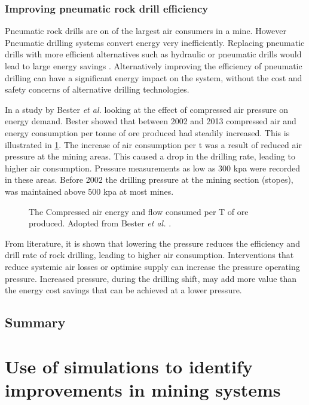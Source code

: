		\subsubsection{Improving pneumatic rock drill efficiency}
		 Pneumatic rock drills are on of the largest air consumers in a mine. However Pneumatic drilling systems convert energy very inefficiently. Replacing pneumatic drills with more efficient alternatives such as hydraulic or pneumatic drills would lead to large energy savings \cite{Pascoe2016Masters}.  Alternatively improving the efficiency of pneumatic drilling can have a significant energy impact on the system, without the cost and safety concerns of alternative drilling technologies.
		 \par 
		  In a study by  Bester \textit{et al.} \cite{bester2013effect} looking at the effect of compressed air pressure on energy demand. Bester showed that between 2002 and 2013 compressed air and energy consumption per tonne of ore produced had steadily increased. This is illustrated  in \cref{fig: Compressed energy and air flow per ton}. 
		 The increase of air consumption per \gls{t} was a result of reduced air pressure at the mining areas. This caused a drop in the drilling rate, leading to higher air consumption. Pressure measurements as low as 300 \gls{kpa} were recorded in these areas. Before 2002 the drilling pressure at the mining section (stopes), was maintained above 500 \gls{kpa} at most mines. 
		 \par 
		 \begin{figure}[h]
		 	\centering
		 	
		 	\caption[The Compressed air energy and flow consumed per T of ore produced.]{The Compressed air energy and flow consumed per T of ore produced. Adopted from Bester \textit{et al.} \cite{bester2013effect}.}
		 	\label{fig: Compressed energy and air flow per ton}
		 \end{figure}
		 From literature, it is shown that lowering the pressure reduces the efficiency and drill rate of rock drilling, leading to higher air consumption. Interventions that reduce systemic air losses or optimise supply can increase the pressure operating pressure. Increased pressure, during the drilling shift, may add more value than the energy cost savings that can be achieved at a lower pressure.
	\subsection{Summary}
\clearpage

\section{Use of simulations to identify improvements in mining systems}
